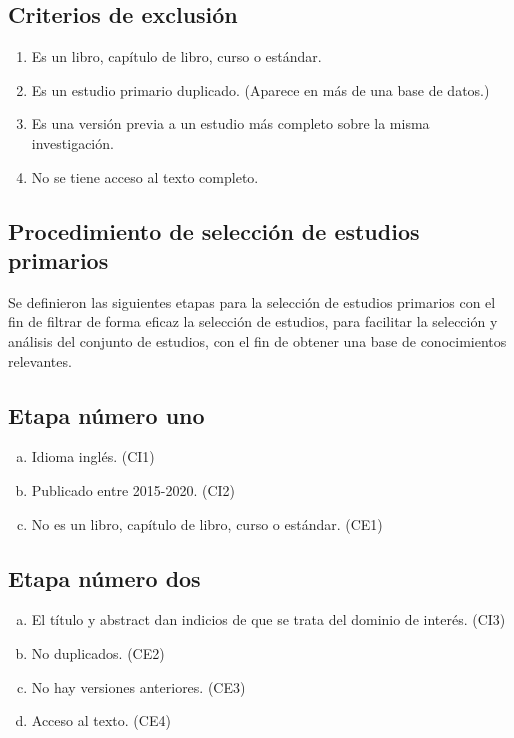 \documentclass{article}
\begin{document}
\subsection{Criterios de exclusión}
\begin{enumerate}[CE-1.-]
  \item{Es un libro, capítulo de libro, curso o estándar.}
  \item{Es un estudio primario duplicado. (Aparece en más de una base de datos.)}
  \item{Es una versión previa a un estudio más completo sobre la misma investigación.}
  \item{No se tiene acceso al texto completo.}
\end{enumerate}
\newpage

\subsection{Procedimiento de selección de estudios primarios}
Se definieron las siguientes etapas para la selección de estudios primarios con el fin 
de filtrar de forma eficaz la selección de estudios, para facilitar la selección y análisis 
del conjunto de estudios, con el fin de obtener una base de conocimientos relevantes. 

\subsection{Etapa número uno}
\begin{enumerate}[(a)]
  \item{Idioma inglés. (CI1)}
  \item{Publicado entre 2015-2020. (CI2)}
  \item{No es un libro, capítulo de libro, curso o estándar. (CE1)}
\end{enumerate}

\subsection{Etapa número dos}
\begin{enumerate}[(a)]
  \item{El título y abstract dan indicios de que se trata del dominio de interés. (CI3)}
  \item{No duplicados. (CE2)}
  \item{No hay versiones anteriores. (CE3) }
  \item{Acceso al texto. (CE4)}
\end{enumerate}
\end{document}
